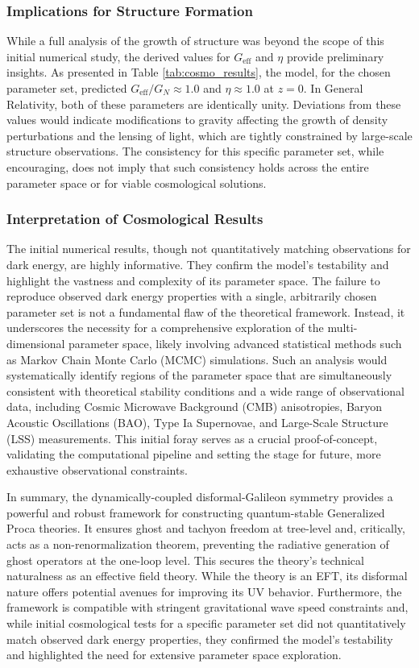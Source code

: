 \documentclass[twocolumn]{aastex631}
\begin{document}
\subsubsection{Implications for Structure Formation}
While a full analysis of the growth of structure was beyond the scope of this initial numerical study, the derived values for $G_{\text{eff}}$ and $\eta$ provide preliminary insights. As presented in Table \ref{tab:cosmo_results}, the model, for the chosen parameter set, predicted $G_{\text{eff}}/G_N \approx 1.0$ and $\eta \approx 1.0$ at $z=0$. In General Relativity, both of these parameters are identically unity. Deviations from these values would indicate modifications to gravity affecting the growth of density perturbations and the lensing of light, which are tightly constrained by large-scale structure observations. The consistency for this specific parameter set, while encouraging, does not imply that such consistency holds across the entire parameter space or for viable cosmological solutions.

\subsubsection{Interpretation of Cosmological Results}
The initial numerical results, though not quantitatively matching observations for dark energy, are highly informative. They confirm the model's testability and highlight the vastness and complexity of its parameter space. The failure to reproduce observed dark energy properties with a single, arbitrarily chosen parameter set is not a fundamental flaw of the theoretical framework. Instead, it underscores the necessity for a comprehensive exploration of the multi-dimensional parameter space, likely involving advanced statistical methods such as Markov Chain Monte Carlo (MCMC) simulations. Such an analysis would systematically identify regions of the parameter space that are simultaneously consistent with theoretical stability conditions and a wide range of observational data, including Cosmic Microwave Background (CMB) anisotropies, Baryon Acoustic Oscillations (BAO), Type Ia Supernovae, and Large-Scale Structure (LSS) measurements. This initial foray serves as a crucial proof-of-concept, validating the computational pipeline and setting the stage for future, more exhaustive observational constraints.

In summary, the dynamically-coupled disformal-Galileon symmetry provides a powerful and robust framework for constructing quantum-stable Generalized Proca theories. It ensures ghost and tachyon freedom at tree-level and, critically, acts as a non-renormalization theorem, preventing the radiative generation of ghost operators at the one-loop level. This secures the theory's technical naturalness as an effective field theory. While the theory is an EFT, its disformal nature offers potential avenues for improving its UV behavior. Furthermore, the framework is compatible with stringent gravitational wave speed constraints and, while initial cosmological tests for a specific parameter set did not quantitatively match observed dark energy properties, they confirmed the model's testability and highlighted the need for extensive parameter space exploration.
\end{document}
